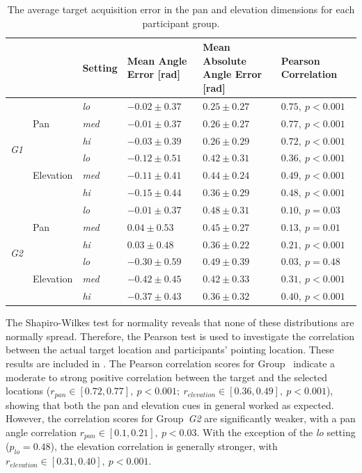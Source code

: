 \documentclass[]{interact}
\begin{document}
\begin{table}
  \centering
  \caption{The average target acquisition error in the pan and elevation dimensions for each participant group. }\label{tab:target-results}
  \begin{tabular}{p{0.5cm}p{1.5cm}p{1.5cm}p{3.0cm}p{3.0cm}p{3.0cm}}
    \toprule
    &           & Setting      & Mean Angle Error [rad] & Mean Absolute Angle Error [rad] &  Pearson Correlation \\ \midrule
    \multirow{6}{*}{\textit{G1}}
    &           & \textit{lo}  & $-0.02\pm0.37$ & $0.25\pm0.27$ & $0.75,~p < 0.001$ \\
    & Pan       & \textit{med} & $-0.01\pm0.37$ & $0.26\pm0.27$ & $0.77,~p < 0.001$ \\
    &           & \textit{hi}  & $-0.03\pm0.39$ & $0.26\pm0.29$ & $0.72,~p < 0.001$ \\ \cline{2-6}
    &           & \textit{lo}  & $-0.12\pm0.51$ & $0.42\pm0.31$ & $0.36,~p < 0.001$ \\
    & Elevation & \textit{med} & $-0.11\pm0.41$ & $0.44\pm0.24$ & $0.49,~p < 0.001$ \\
    &           & \textit{hi}  & $-0.15\pm0.44$ & $0.36\pm0.29$ & $0.48,~p < 0.001$ \\ \midrule
    \multirow{6}{*}{\textit{G2}}
    &           & \textit{lo}  & $-0.01\pm0.37$ & $0.48\pm0.31$ & $0.10,~p = 0.03$  \\
    & Pan       & \textit{med} & $ 0.04\pm0.53$ & $0.45\pm0.27$ & $0.13,~p = 0.01$  \\
    &           & \textit{hi}  & $ 0.03\pm0.48$ & $0.36\pm0.22$ & $0.21,~p < 0.001$ \\\cline{2-6}
    &           & \textit{lo}  & $-0.30\pm0.59$ & $0.49\pm0.39$ & $0.03,~p = 0.48$  \\
    & Elevation & \textit{med} & $-0.42\pm0.45$ & $0.42\pm0.33$ & $0.31,~p < 0.001$ \\
    &           & \textit{hi}  & $-0.37\pm0.43$ & $0.36\pm0.32$ & $0.40,~p < 0.001$ \\ 
    \bottomrule
  \end{tabular}
\end{table}

The Shapiro-Wilkes test for normality reveals that none of these distributions are normally spread. Therefore, the Pearson test is used to investigate the correlation between the actual target location and participants' pointing location.
These results are included in .
The Pearson correlation scores for Group~ indicate a moderate to strong positive correlation between the target and the selected locations ($r_{pan} \in [0.72, 0.77],~p < 0.001;~r_{elevation} \in [0.36, 0.49],~p < 0.001$), showing that both the pan and elevation cues in general worked as expected.
However, the correlation scores for Group~\textit{G2} are significantly weaker, with a pan angle correlation $r_{pan} \in [0.1, 0.21],~p < 0.03$.
With the exception of the \textit{lo} setting ($p_{lo} = 0.48$), the elevation correlation is generally stronger, with $r_{elevation} \in [0.31, 0.40],~p < 0.001$.
\end{document}
